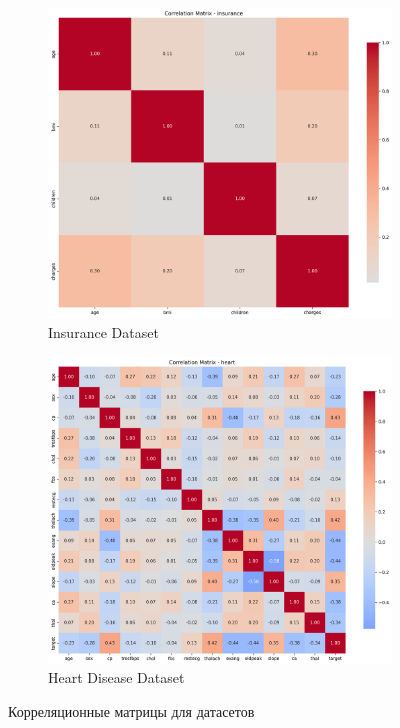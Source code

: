 \documentclass[a4paper]{article}
\begin{document}
\begin{figure}[H]
\centering
\begin{subfigure}{0.45\textwidth}
    \includegraphics[width=\textwidth]{images/correlation_heatmap_insurance.png}
    \caption{Insurance Dataset}
\end{subfigure}
\hfill
\begin{subfigure}{0.45\textwidth}
    \includegraphics[width=\textwidth]{images/correlation_heatmap_heart.png}
    \caption{Heart Disease Dataset}
\end{subfigure}
\caption{Корреляционные матрицы для датасетов}
\end{figure}
\end{document}
